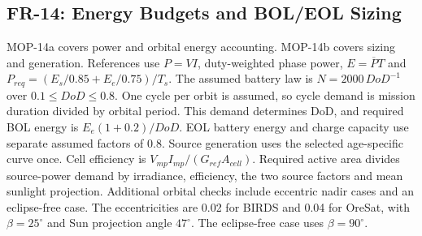 \subsection{FR-14: Energy Budgets and BOL/EOL Sizing}
MOP-14a covers power and orbital energy accounting. MOP-14b covers sizing and generation.
References use $P=VI$, duty-weighted phase power, $E=\overline P T$ and
$P_{req}=(E_s/0.85+E_e/0.75)/T_s$.
The assumed battery law is $N=2000\,DoD^{-1}$ over $0.1\le DoD\le0.8$.
One cycle per orbit is assumed, so cycle demand is mission duration divided by orbital period.
This demand determines DoD, and required BOL energy is $E_e(1+0.2)/DoD$.
EOL battery energy and charge capacity use separate assumed factors of 0.8.
Source generation uses the selected age-specific curve once.
Cell efficiency is $V_{mp}I_{mp}/(G_{ref}A_{cell})$.
Required active area divides source-power demand by irradiance, efficiency, the two source factors and mean sunlight projection.
Additional orbital checks include eccentric nadir cases and an eclipse-free case.
The eccentricities are 0.02 for BIRDS and 0.04 for OreSat, with $\beta=25^\circ$ and Sun projection angle $47^\circ$.
The eclipse-free case uses $\beta=90^\circ$.


